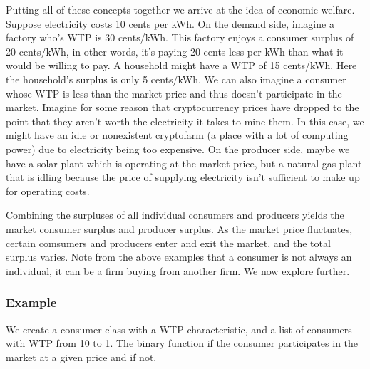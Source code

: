 \documentclass[letterpaper,10pt,english]{jupyterBook}
\begin{document}
\sphinxAtStartPar
Putting all of these concepts together we arrive at the idea of economic welfare. Suppose electricity costs 10 cents per kWh. On the demand side, imagine a factory who’s WTP is 30 cents/kWh. This factory enjoys a consumer surplus of 20 cents/kWh, in other words, it’s paying 20 cents less per kWh than what it would be willing to pay. A household might have a WTP of 15 cents/kWh. Here the household’s surplus is only 5 cents/kWh. We can also imagine a consumer whose WTP is less than the market price and thus doesn’t participate in the market. Imagine for some reason that cryptocurrency prices have dropped to the point that they aren’t worth the electricity it takes to mine them. In this case, we might have an idle or non\sphinxhyphen{}existent crypto\sphinxhyphen{}farm (a place with a lot of computing power) due to electricity being too expensive. On the producer side, maybe we have a solar plant which is operating at the market price, but a natural gas plant that is idling because the price of supplying electricity isn’t sufficient to make up for operating costs.

\sphinxAtStartPar
Combining the surpluses of all individual consumers and producers yields the market consumer surplus and producer surplus. As the market price fluctuates, certain comsumers and producers enter and exit the market, and the total surplus varies. Note from the above examples that a consumer is not always an individual, it can be a firm buying from another firm. We now explore further.


\subsubsection{Example}
\label{\detokenize{content/03-public/surplus:example}}
\sphinxAtStartPar
We create a consumer class with a WTP characteristic, and a list of consumers with WTP from 10 to 1. The binary function   if the consumer participates in the market at a given price and  if not.
\end{document}
